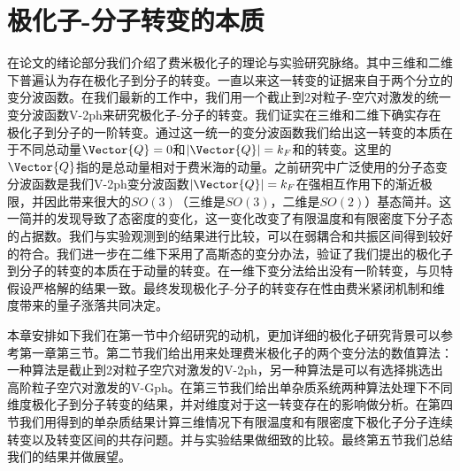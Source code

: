 \chapter{极化子-分子转变的本质}\label{chap2polaron}

在论文的绪论部分我们介绍了费米极化子的理论与实验研究脉络。其中三维和二维下普遍认为存在极化子到分子的转变。一直以来这一转变的证据来自于两个分立的变分波函数。在我们最新的工作中，我们用一个截止到2对粒子-空穴对激发的统一变分波函数V-2ph来研究极化子-分子的转变。我们证实在三维和二维下确实存在极化子到分子的一阶转变。通过这一统一的变分波函数我们给出这一转变的本质在于不同总动量$\Vector{Q}=0$和$|\Vector{Q}|=k_F$和的转变。这里的$\Vector{Q}$指的是总动量相对于费米海的动量。之前研究中广泛使用的分子态变分波函数是我们V-2ph变分波函数$|\Vector{Q}|=k_F$在强相互作用下的渐近极限，并因此带来很大的$SO(3)$（三维是$SO(3)$，二维是$SO(2)$）基态简并。这一简并的发现导致了态密度的变化，这一变化改变了有限温度和有限密度下分子态的占据数。我们与实验观测到的结果进行比较，可以在弱耦合和共振区间得到较好的符合。我们进一步在二维下采用了高斯态的变分办法，验证了我们提出的极化子到分子的转变的本质在于动量的转变。在一维下变分法给出没有一阶转变，与贝特假设严格解的结果一致。最终发现极化子-分子的转变存在性由费米紧闭机制和维度带来的量子涨落共同决定。

本章安排如下我们在第一节中介绍研究的动机，更加详细的极化子研究背景可以参考第一章第三节。第二节我们给出用来处理费米极化子的两个变分法的数值算法：一种算法是截止到2对粒子空穴对激发的V-2ph，另一种算法是可以有选择挑选出高阶粒子空穴对激发的V-Gph。在第三节我们给出单杂质系统两种算法处理下不同维度极化子到分子转变的结果，并对维度对于这一转变存在的影响做分析。在第四节我们用得到的单杂质结果计算三维情况下有限温度和有限密度下极化子分子连续转变以及转变区间的共存问题。并与实验结果做细致的比较。最终第五节我们总结我们的结果并做展望。

